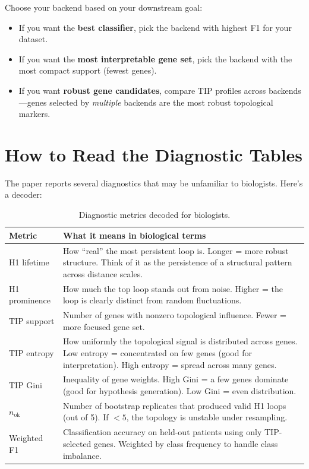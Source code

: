 \documentclass[11pt]{article}
\begin{document}
\begin{takeaway}
Choose your backend based on your downstream goal:
\begin{itemize}
    \item If you want the \textbf{best classifier}, pick the backend with highest F1 for your dataset.
    \item If you want the \textbf{most interpretable gene set}, pick the backend with the most compact support (fewest genes).
    \item If you want \textbf{robust gene candidates}, compare TIP profiles across backends---genes selected by \emph{multiple} backends are the most robust topological markers.
\end{itemize}
\end{takeaway}

\section{How to Read the Diagnostic Tables}
\label{sec:diagnostics}

The paper reports several diagnostics that may be unfamiliar to biologists. Here's a decoder:

\begin{table}[h]
\centering
\small
\begin{tabular}{p{3cm}p{9cm}}
\toprule
\textbf{Metric} & \textbf{What it means in biological terms} \\
\midrule
H1 lifetime & How ``real'' the most persistent loop is. Longer = more robust structure. Think of it as the persistence of a structural pattern across distance scales. \\
\midrule
H1 prominence & How much the top loop stands out from noise. Higher = the loop is clearly distinct from random fluctuations. \\
\midrule
TIP support & Number of genes with nonzero topological influence. Fewer = more focused gene set. \\
\midrule
TIP entropy & How uniformly the topological signal is distributed across genes. Low entropy = concentrated on few genes (good for interpretation). High entropy = spread across many genes. \\
\midrule
TIP Gini & Inequality of gene weights. High Gini = a few genes dominate (good for hypothesis generation). Low Gini = even distribution. \\
\midrule
$n_{\text{ok}}$ & Number of bootstrap replicates that produced valid H1 loops (out of 5). If $< 5$, the topology is unstable under resampling. \\
\midrule
Weighted F1 & Classification accuracy on held-out patients using only TIP-selected genes. Weighted by class frequency to handle class imbalance. \\
\bottomrule
\end{tabular}
\caption{Diagnostic metrics decoded for biologists.}
\end{table}
\end{document}

